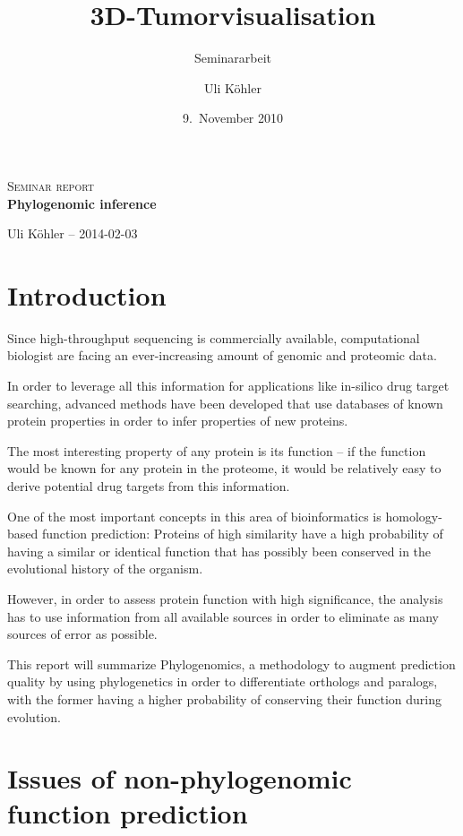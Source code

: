 \documentclass[pdftex,paper=A4,DIV=calc,titlepage,12pt]{scrartcl}
\title{3D-Tumorvisualisation}
\subtitle{Seminararbeit}
\author{Uli Köhler}
\date{9.~November 2010}
\newtheorem[L]{boxedDefinition}{Definition}
\begin{document}
\begin{titlepage}
\begin{center}
 \end{center}
\vspace{2cm}
\begin{center}
 \large\textsc{Seminar report}\\[5mm]
 {\Huge\centering\bfseries\selectfont Phylogenomic inference}\\[2cm]
\begin{center}
  Uli Köhler -- 2014-02-03
\end{center}
\vspace{2cm}
\end{center}
\tableofcontents
\end{titlepage}

\section{Introduction}
Since high-throughput sequencing is commercially available, computational biologist are facing an ever-increasing amount of genomic and proteomic data.

In order to leverage all this information for applications like in-silico drug target searching, advanced methods have been developed that use databases of known protein properties in order to infer properties of new proteins.

The most interesting property of any protein is its function -- if the function would be known for any protein in the proteome, it would be relatively easy to derive potential drug targets from this information.

One of the most important concepts in this area of bioinformatics is homology-based function prediction: Proteins of high similarity have a high probability of having a similar or identical function that has possibly been conserved in the evolutional history of the organism.

However, in order to assess protein function with high significance, the analysis has to use information from all available sources in order to eliminate as many sources of error as possible.

This report will summarize Phylogenomics, a methodology to augment prediction quality by using phylogenetics in order to differentiate orthologs and paralogs, with the former having a higher probability of conserving their function during evolution.

\section{Issues of non-phylogenomic function prediction}\label{sec:nonphylo-issues}
\end{document}
